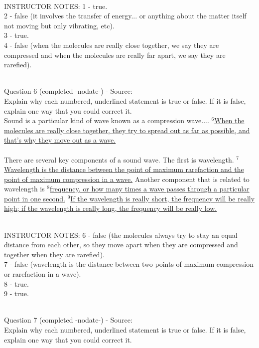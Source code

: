 \documentclass[12pt]{article}
\begin{document}
~\\
INSTRUCTOR NOTES: 1 - true.\\2 - false (it involves the transfer of energy... or anything about the matter itself not moving but only vibrating, etc). \\3 - true.\\4 - false (when the molecules are really close together, we say they are compressed and when the molecules are really far apart, we say they are rarefied).


~\\

{\large Question 6} (completed -nodate-) - Source: \\

Explain why each numbered, underlined statement is true or false. If it is false, explain one way that you could correct it.\\

Sound is a particular kind of wave known as a compression wave.... $^6$\ul{When the molecules are really close together, they try to spread out as far as possible, and that’s why they move out as a wave.}\\\\There are several key components of a sound wave. The first is wavelength. $^7$\ul{Wavelength is the distance between the point of maximum rarefaction and the point of maximum compression in a wave.} Another component that is related to wavelength is $^8$\ul{frequency, or how many times a wave passes through a particular point in one second.} $^9$\ul{If the wavelength is really short, the frequency will be really high; if the wavelength is really long, the frequency will be really low.} 


~\\
INSTRUCTOR NOTES: 6 - false (the molecules always try to stay an equal distance from each other, so they move apart when they are compressed and together when they are rarefied).\\7 - false (wavelength is the distance between two points of maximum compression or rarefaction in a wave).\\8 - true.\\9 - true.


~\\

{\large Question 7} (completed -nodate-) - Source: \\

Explain why each numbered, underlined statement is true or false. If it is false, explain one way that you could correct it.\\
\end{document}
